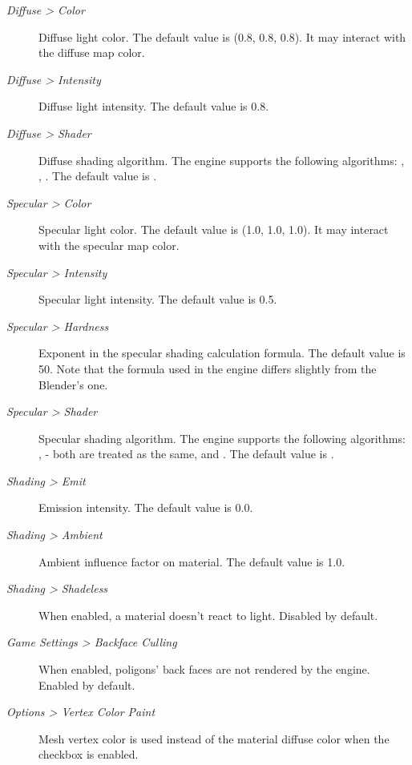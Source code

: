 \documentclass[a4paper,12pt,oneside]{sphinxmanual}
\begin{document}
\begin{description}
\item[{\emph{Diffuse \textgreater{} Color}}] \leavevmode
Diffuse light color. The default value is (0.8, 0.8, 0.8). It may interact with the diffuse map color.

\item[{\emph{Diffuse \textgreater{} Intensity}}] \leavevmode
Diffuse light intensity. The default value is 0.8.

\item[{\emph{Diffuse \textgreater{} Shader}}] \leavevmode
Diffuse shading algorithm. The engine supports the following algorithms: , , . The default value is .

\item[{\emph{Specular \textgreater{} Color}}] \leavevmode
Specular light color. The default value is (1.0, 1.0, 1.0). It may interact with the specular map color.

\item[{\emph{Specular \textgreater{} Intensity}}] \leavevmode
Specular light intensity. The default value is 0.5.

\item[{\emph{Specular \textgreater{} Hardness}}] \leavevmode
Exponent in the specular shading calculation formula. The default value is 50. Note that the formula used in the engine differs slightly from the Blender's one.

\item[{\emph{Specular \textgreater{} Shader}}] \leavevmode
Specular shading algorithm. The engine supports the following algorithms: ,  - both are treated as the same, and . The default value is .

\item[{\emph{Shading \textgreater{} Emit}}] \leavevmode
Emission intensity. The default value is 0.0.

\item[{\emph{Shading \textgreater{} Ambient}}] \leavevmode
Ambient influence factor on material. The default value is 1.0.

\item[{\emph{Shading \textgreater{} Shadeless}}] \leavevmode
When enabled, a material doesn't react to light. Disabled by default.

\item[{\emph{Game Settings \textgreater{} Backface Culling}}] \leavevmode
When enabled, poligons' back faces are not rendered by the engine. Enabled by default.

\item[{\emph{Options \textgreater{} Vertex Color Paint}}] \leavevmode
Mesh vertex color is used instead of the material diffuse color when the checkbox is enabled.

\end{description}
\end{document}
